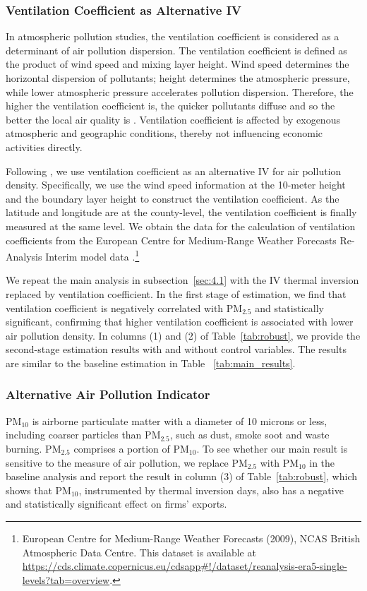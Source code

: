 \documentclass[12pt]{article}
\begin{document}
\subsubsection{Ventilation Coefficient as Alternative IV}
In atmospheric pollution studies, the ventilation coefficient is considered as a determinant of air pollution dispersion.
The ventilation coefficient is defined as the product of wind speed and mixing layer height. Wind speed determines the horizontal dispersion 
of pollutants; height determines the atmospheric pressure, while lower atmospheric pressure accelerates pollution dispersion. Therefore, the higher the ventilation coefficient is, the quicker pollutants diffuse and so the better the local air quality is \citep{arya1999air}. Ventilation coefficient is affected by exogenous atmospheric and geographic conditions, thereby not influencing economic activities directly. 

Following \citep{broner2012sources,hering2014environmental,shi2018environmental,wu2021greening}, we use ventilation coefficient
as an alternative IV for air pollution density. Specifically, we use the wind speed information at the 10-meter height and the boundary layer height to construct the ventilation coefficient. As the latitude and longitude are at the county-level, the ventilation coefficient is finally measured at the same level. We obtain the data for the calculation of ventilation coefficients from the European Centre for Medium-Range Weather Forecasts Re-Analysis Interim model data
.\footnote{European Centre for Medium-Range Weather Forecasts (2009), NCAS British Atmospheric Data Centre. This dataset is available at \url{https://cds.climate.copernicus.eu/cdsapp\#!/dataset/reanalysis-era5-single-levels?tab=overview}.}

We repeat the main analysis in subsection~\ref{sec:4.1} with the IV 
thermal inversion replaced by ventilation coefficient. In the first stage of
estimation, we find that ventilation coefficient is negatively correlated
with $\mathrm{PM_{2.5}}$ and statistically significant, confirming that
higher ventilation coefficient is associated with lower air pollution
density. In columns (1) and (2) of Table~\ref{tab:robust}, we
provide the second-stage estimation results with and without control variables. The results are similar to the baseline estimation in Table~%
\ref{tab:main_results}.

\subsubsection{Alternative Air Pollution Indicator}
 $\mathrm{PM_{10}}$ is airborne particulate matter with a diameter of 10 microns or less, including coarser particles than $\mathrm{PM_{2.5}}$, such as dust, smoke soot and waste burning. $\mathrm{PM_{2.5}}$ comprises a portion of $\mathrm{PM_{10}}$. To see whether our main result is sensitive
to the measure of air pollution, we replace $\mathrm{PM_{2.5}}$ with $%
\mathrm{PM_{10}}$ in the baseline analysis and report the result in column
(3) of Table~\ref{tab:robust}, which shows that $\mathrm{PM_{10}}$,
instrumented by thermal inversion days, also has a negative and
statistically significant effect on firms' exports.
\end{document}
